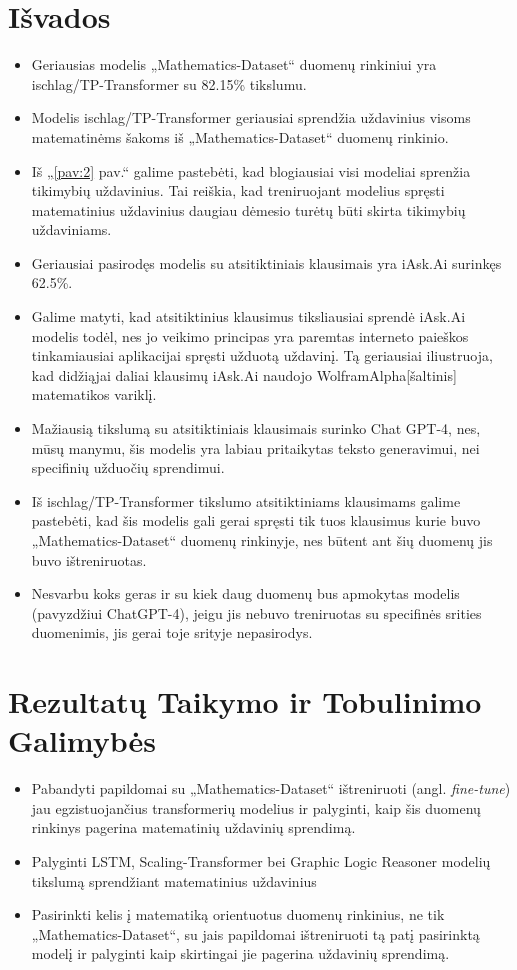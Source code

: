 \documentclass[conference]{IEEEtran}
\begin{document}
\section{Išvados}
\begin{itemize}
    \item Geriausias modelis „Mathematics-Dataset“ duomenų rinkiniui yra ischlag/TP-Transformer su 82.15\% tikslumu.
    \item Modelis ischlag/TP-Transformer geriausiai sprendžia uždavinius visoms matematinėms šakoms iš „Mathematics-Dataset“ duomenų rinkinio.
    \item Iš „\ref{pav:2} pav.“ galime pastebėti, kad blogiausiai visi modeliai sprenžia tikimybių uždavinius. Tai reiškia, kad treniruojant modelius spręsti matematinius uždavinius daugiau dėmesio turėtų būti skirta tikimybių uždaviniams.
    \item Geriausiai pasirodęs modelis su atsitiktiniais klausimais yra iAsk.Ai surinkęs 62.5\%.
    \item Galime matyti, kad atsitiktinius klausimus tiksliausiai sprendė iAsk.Ai modelis todėl, nes jo veikimo principas yra paremtas interneto paieškos tinkamiausiai aplikacijai spręsti užduotą uždavinį. Tą geriausiai iliustruoja, kad didžiąjai daliai klausimų iAsk.Ai naudojo WolframAlpha[šaltinis] matematikos variklį.
    \item Mažiausią tikslumą su atsitiktiniais klausimais surinko Chat GPT-4, nes, mūsų manymu, šis modelis yra labiau pritaikytas teksto generavimui, nei specifinių užduočių sprendimui.
    \item Iš ischlag/TP-Transformer tikslumo atsitiktiniams klausimams galime pastebėti, kad šis modelis gali gerai spręsti tik tuos klausimus kurie buvo „Mathematics-Dataset“ duomenų rinkinyje, nes būtent ant šių duomenų jis buvo ištreniruotas.
    \item Nesvarbu koks geras ir su kiek daug duomenų bus apmokytas modelis (pavyzdžiui ChatGPT-4), jeigu jis nebuvo treniruotas su specifinės srities duomenimis, jis gerai toje srityje nepasirodys.
\end{itemize}
\section{Rezultatų Taikymo ir Tobulinimo Galimybės}
\begin{itemize}
    \item Pabandyti papildomai su „Mathematics-Dataset“ ištreniruoti (angl. \textit{fine-tune}) jau egzistuojančius transformerių modelius ir palyginti, kaip šis duomenų rinkinys pagerina matematinių uždavinių sprendimą.
    \item Palyginti LSTM, Scaling-Transformer bei Graphic Logic Reasoner modelių tikslumą sprendžiant matematinius uždavinius \cite{dataset}
    \item Pasirinkti kelis į matematiką orientuotus duomenų rinkinius, ne tik „Mathematics-Dataset“, su jais papildomai ištreniruoti tą patį pasirinktą modelį ir palyginti kaip skirtingai jie pagerina uždavinių sprendimą. 
\end{itemize}



\end{document}
